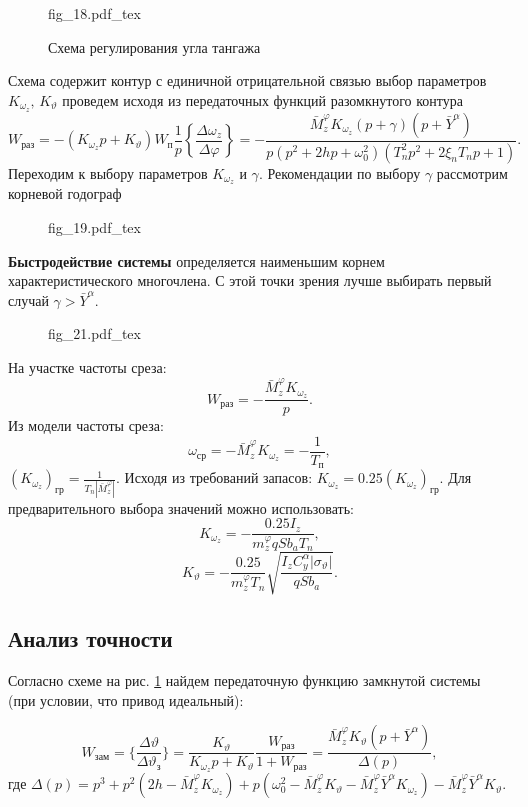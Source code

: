 \documentclass{article}
\begin{document}
\begin{figure}[ht]
    \centering
    {fig_18.pdf_tex}
    \caption{Схема регулирования угла тангажа}
    \label{fig:18}
\end{figure}

Схема содержит контур с единичной отрицательной связью выбор параметров
$K_{\omega_z}, \, K_{\vartheta}$ проведем исходя из передаточных функций
разомкнутого контура
\[
    W_\text{раз} = -(K_{\omega_z} p + K_\vartheta) W_\text{п}
    \frac{1}{p}\left\{{\frac{\Delta \omega_z}{\Delta \varphi}}\right\} =
    -\frac{\bar{M}_z^\varphi K_{\omega_{z}}(p + \gamma)(p +
    \bar{Y}^\alpha)}{p(p^2 + 2hp + \omega_0^2)(T_n^2 p^2 + 2 \xi_n T_n p +1)}.
\]
Переходим к выбору параметров $K_{\omega_z}$ и $\gamma$.
Рекомендации по выбору $\gamma$ рассмотрим корневой годограф

\begin{figure}[H]
    \centering
    {fig_19.pdf_tex}
\end{figure}

\textbf{Быстродействие системы} определяется наименьшим корнем
характеристического многочлена.
С этой точки зрения лучше выбирать первый случай $\gamma > \bar{Y}^\alpha$.

\begin{figure}[H]
    \centering
    {fig_21.pdf_tex}
\end{figure}

На участке частоты среза:
\[
    W_\text{раз} = -\frac{\bar{M}_z^\varphi K_{\omega_z}}{p}.
\]
Из модели частоты среза:
\[
    \omega_\text{ср} = -\bar{M}_z^\varphi K_{\omega_z} = -\frac{1}{T_\text{п}},
\]
$(K_{\omega_z})_\text{гр} = \frac{1}{T_n |\bar{M}_z^\varphi|}.$
Исходя из требований запасов:
$K_{\omega_z} = 0.25 (K_{\omega_z})_\text{гр}.$
Для предварительного выбора значений можно использовать:
\[
    K_{\omega_z} = - \frac{0.25 I_z}{{m}_z^\varphi q S b_a T_n},
\]
\[
    K_{\vartheta} = - \frac{0.25}{{m}_z^\varphi T_n} \sqrt{\frac{I_z C_y^\alpha
    |\sigma_\vartheta|}{q S b_a}}.
\]

\subsection{Анализ точности}
Согласно схеме на рис. \ref{fig:18} найдем передаточную функцию замкнутой
системы (при условии, что привод идеальный):

\begin{equation}
    W_\text{зам}= \{\frac{\Delta \vartheta}{\Delta \vartheta_\text{з}}\}
    =\frac{K_{\vartheta}}{K_{\omega_z}p +K_{\vartheta}}\frac{W_\text{раз}}{1 +
    W_\text{раз}} =\frac{\bar{M}_z^\varphi K_{\vartheta}(p +
\bar{Y}^\alpha)}{\Delta(p)},
    \label{eq:w_zam_1}
\end{equation}
где $\Delta(p) = p^3 + p^2(2h - \bar{M}_z^\varphi K_{\omega_z}) + p(\omega_0^2
-\bar{M}_z^\varphi K_\vartheta - \bar{M}_z^\varphi \bar{Y}^\alpha K_{\omega_z})
-\bar{M}_z^\varphi \bar{Y}^\alpha K_{\vartheta} $.
\end{document}
